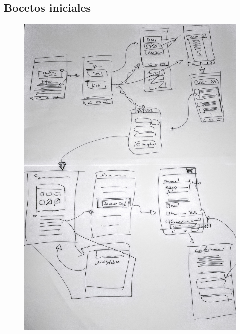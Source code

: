 \documentclass[a4paper,11pt]{article}
\begin{document}
\subsection{Bocetos iniciales}\label{bocetos}
\begin{figure}[H]
  \centering
  \includegraphics[scale=0.80]{bocetos.jpg}
\end{figure}
\end{document}
